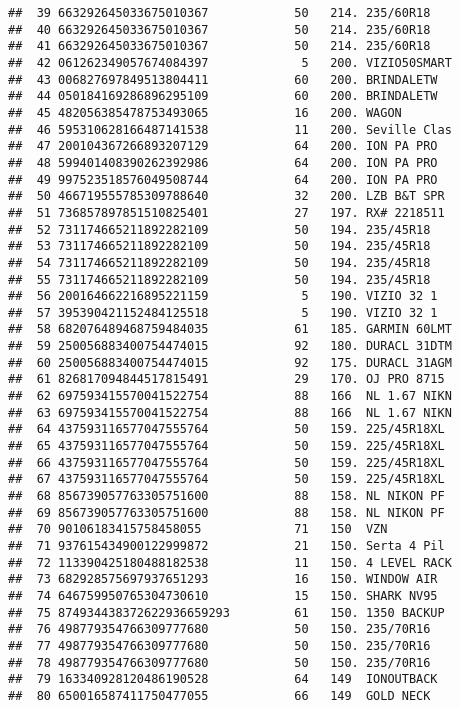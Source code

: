 \documentclass[]{article}
\begin{document}
\begin{verbatim}
##  39 663292645033675010367            50   214. 235/60R18   
##  40 663292645033675010367            50   214. 235/60R18   
##  41 663292645033675010367            50   214. 235/60R18   
##  42 061262349057674084397             5   200. VIZIO50SMART
##  43 006827697849513804411            60   200. BRINDALETW  
##  44 050184169286896295109            60   200. BRINDALETW  
##  45 482056385478753493065            16   200. WAGON       
##  46 595310628166487141538            11   200. Seville Clas
##  47 200104367266893207129            64   200. ION PA PRO  
##  48 599401408390262392986            64   200. ION PA PRO  
##  49 997523518576049508744            64   200. ION PA PRO  
##  50 466719555785309788640            32   200. LZB B&T SPR 
##  51 736857897851510825401            27   197. RX# 2218511 
##  52 731174665211892282109            50   194. 235/45R18   
##  53 731174665211892282109            50   194. 235/45R18   
##  54 731174665211892282109            50   194. 235/45R18   
##  55 731174665211892282109            50   194. 235/45R18   
##  56 200164662216895221159             5   190. VIZIO 32 1  
##  57 395390421152484125518             5   190. VIZIO 32 1  
##  58 682076489468759484035            61   185. GARMIN 60LMT
##  59 250056883400754474015            92   180. DURACL 31DTM
##  60 250056883400754474015            92   175. DURACL 31AGM
##  61 826817094844517815491            29   170. OJ PRO 8715 
##  62 697593415570041522754            88   166  NL 1.67 NIKN
##  63 697593415570041522754            88   166  NL 1.67 NIKN
##  64 437593116577047555764            50   159. 225/45R18XL 
##  65 437593116577047555764            50   159. 225/45R18XL 
##  66 437593116577047555764            50   159. 225/45R18XL 
##  67 437593116577047555764            50   159. 225/45R18XL 
##  68 856739057763305751600            88   158. NL NIKON PF 
##  69 856739057763305751600            88   158. NL NIKON PF 
##  70 90106183415758458055             71   150  VZN         
##  71 937615434900122999872            21   150. Serta 4 Pil 
##  72 113390425180488182538            11   150. 4 LEVEL RACK
##  73 682928575697937651293            16   150. WINDOW AIR  
##  74 646759950765304730610            15   150. SHARK NV95  
##  75 874934438372622936659293         61   150. 1350 BACKUP 
##  76 498779354766309777680            50   150. 235/70R16   
##  77 498779354766309777680            50   150. 235/70R16   
##  78 498779354766309777680            50   150. 235/70R16   
##  79 163340928120486190528            64   149  IONOUTBACK  
##  80 650016587411750477055            66   149  GOLD NECK   

\end{verbatim}
\end{document}
